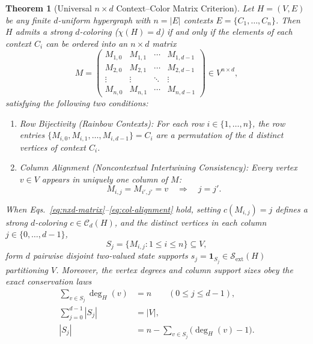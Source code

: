 \documentclass[aps,pra,reprint,superscriptaddress,longbibliography,nofootinbib,floatfix,10pt]{revtex4-2}
\newtheorem{theorem}{Theorem}
\theoremstyle{definition}\newtheorem{definition}[theorem]{Definition}
\theoremstyle{remark}\newtheorem{remark}[theorem]{Remark}
\newcommand{\Sc}{\mathcal S}\newcommand{\Cc}{\mathcal C}
\begin{document}
\begin{theorem}[Universal $n\times d$ Context--Color Matrix Criterion]\label{thm:nxd-matrix}
Let $H=(V,E)$ be any finite $d$-uniform hypergraph with $n=|E|$ contexts $E=\{C_1,\ldots,C_n\}$. Then $H$ admits a strong $d$-coloring ($\chi(H)=d$) if and only if the elements of each context $C_i$ can be ordered into an $n\times d$ matrix
\begin{equation}\label{eq:nxd-matrix}
M=\begin{pmatrix}
M_{1,0} & M_{1,1} & \cdots & M_{1,d-1}\\
M_{2,0} & M_{2,1} & \cdots & M_{2,d-1}\\
\vdots  & \vdots  & \ddots & \vdots\\
M_{n,0} & M_{n,1} & \cdots & M_{n,d-1}
\end{pmatrix}\in V^{n\times d},
\end{equation}
satisfying the following two conditions:
\begin{enumerate}
\item \emph{Row Bijectivity (Rainbow Contexts):} For each row $i\in\{1,\ldots,n\}$, the row entries $\{M_{i,0},M_{i,1},\ldots,M_{i,d-1}\}=C_i$ are a permutation of the $d$ distinct vertices of context $C_i$.
\item \emph{Column Alignment (Noncontextual Intertwining Consistency):} Every vertex $v\in V$ appears in \emph{uniquely one column} of $M$:
\begin{equation}\label{eq:col-alignment}
M_{i,j}=M_{i',j'}=v \quad\Longrightarrow\quad j=j'.
\end{equation}
\end{enumerate}
When Eqs.~\eqref{eq:nxd-matrix}--\eqref{eq:col-alignment} hold, setting $c(M_{i,j})=j$ defines a strong $d$-coloring $c\in\Cc_d(H)$, and the distinct vertices in each column $j\in\{0,\ldots,d-1\}$,
\begin{equation}\label{eq:col-state}
S_j=\{M_{i,j}:1\le i\le n\}\subseteq V,
\end{equation}
form $d$ pairwise disjoint two-valued state supports $s_j=\mathbf{1}_{S_j}\in\Sc_{\mathrm{ext}}(H)$ partitioning $V$. Moreover, the vertex degrees and column support sizes obey the exact conservation laws
\begin{align}
\sum_{v\in S_j}\deg_H(v) &= n \qquad (0\le j\le d-1),\label{eq:deg-conservation}\\
\sum_{j=0}^{d-1}|S_j| &= |V|,\label{eq:size-conservation}\\
|S_j| &= n - \sum_{v\in S_j}\bigl(\deg_H(v)-1\bigr).\label{eq:hinge-saving}
\end{align}
\end{theorem}
\end{document}
